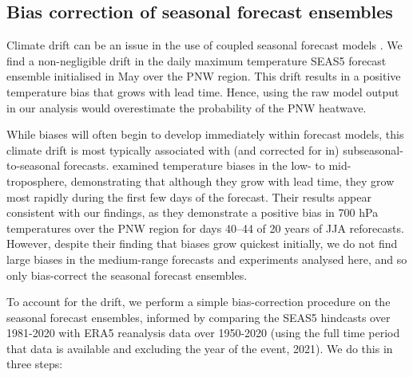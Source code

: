   \subsection*{Bias correction of seasonal forecast ensembles}
  
    Climate drift can be an issue in the use of coupled seasonal forecast models \cite{stockdale_coupled_1997}. We find a non-negligible drift in the daily maximum temperature SEAS5 forecast ensemble initialised in May over the PNW region. This drift results in a positive temperature bias that grows with lead time. Hence, using the raw model output in our analysis would overestimate the probability of the PNW heatwave.

    \begin{mccorrection}
      While biases will often begin to develop immediately within forecast models, this climate drift is most typically associated with (and corrected for in) subseasonal-to-seasonal forecasts. \citet{magnusson_summary_2022} examined temperature biases in the low- to mid-troposphere, demonstrating that although they grow with lead time, they grow most rapidly during the first few days of the forecast. Their results appear consistent with our findings, as they demonstrate a positive bias in 700 hPa temperatures over the PNW region for days 40--44 of 20 years of JJA reforecasts. However, despite their finding that biases grow quickest initially, we do not find large biases in the medium-range forecasts and experiments analysed here, and so only bias-correct the seasonal forecast ensembles.
    \end{mccorrection}
  
    To account for the drift, we perform a simple bias-correction procedure on the seasonal forecast ensembles, informed by comparing the SEAS5 hindcasts over 1981-2020 with ERA5 reanalysis data over 1950-2020 (using the full time period that data is available and excluding the year of the event, 2021). We do this in three steps:
    
